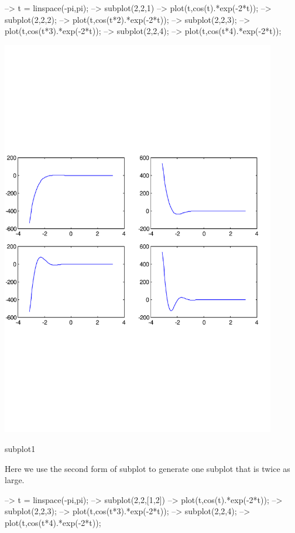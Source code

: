 \begin{DoxyVerbInclude}
--> t = linspace(-pi,pi);
--> subplot(2,2,1)
--> plot(t,cos(t).*exp(-2*t));
--> subplot(2,2,2);
--> plot(t,cos(t*2).*exp(-2*t));
--> subplot(2,2,3);
--> plot(t,cos(t*3).*exp(-2*t));
--> subplot(2,2,4);
--> plot(t,cos(t*4).*exp(-2*t));
\end{DoxyVerbInclude}


 
\begin{DoxyImage}
\includegraphics[width=12cm]{subplot1}
\caption{subplot1}
\end{DoxyImage}
 Here we use the second form of {\ttfamily subplot} to generate one subplot that is twice as large.


\begin{DoxyVerbInclude}
--> t = linspace(-pi,pi);
--> subplot(2,2,[1,2])
--> plot(t,cos(t).*exp(-2*t));
--> subplot(2,2,3);
--> plot(t,cos(t*3).*exp(-2*t));
--> subplot(2,2,4);
--> plot(t,cos(t*4).*exp(-2*t));
\end{DoxyVerbInclude}


